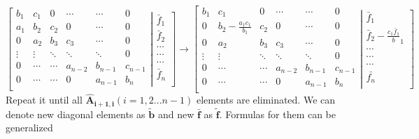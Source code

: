 \documentclass[12pt]{article}
\begin{document}
\[   
\left[\begin{array}{cccccc}   
    b_1 &    c_1    & 0   & \cdots  & \cdots  & 0 \\  
    a_1 &    b_2    & c_2  & 0       & \cdots  & 0\\
    0 &    a_2    & b_3  & c_3       & \cdots  & 0\\ 
    \vdots &    \vdots    & \ddots  & \ddots  & \ddots  & 0\\ 
    0 &    \cdots    & \cdots  & a_{n-2}       & b_{n-1}  & c_{n-1}\\ 
    0 &    \cdots    & \cdots  & 0       & a_{n-1}  & b_{n}\\ 
\end{array}\left|\begin{array}{c}
    \bar{f}_1 \\    \bar{f}_2   \\ \cdots\\ \cdots \\ \cdots \\ \bar{f}_n\\
 \end{array}\right]\right. \rightarrow \left[\begin{array}{cccccc}   
    b_1 &    c_1    & 0   & \cdots  & \cdots  & 0 \\  
    0 &    b_2 - \frac{a_1c_1}{b_1}    & c_2  & 0       & \cdots  & 0\\
    0 &    a_2    & b_3  & c_3       & \cdots  & 0\\ 
    \vdots &    \vdots    & \ddots  & \ddots  & \ddots  & 0\\ 
    0 &    \cdots    & \cdots  & a_{n-2}       & b_{n-1}  & c_{n-1}\\ 
    0 &    \cdots    & \cdots  & 0       & a_{n-1}  & b_{n}\\ 
\end{array}\left|\begin{array}{c}
    \bar{f}_1 \\  \bar{f}_2-\frac{c_1\bar{f}_1}{b}_1   \\ \cdots\\ \cdots \\ \cdots \\ \bar{f_n}\\
 \end{array}\right]\right.
 \] 
Repeat it until all $\mathbf{\hat{A}_{i+1,i}} (i = 1, 2 ... n-1)$ elements are eliminated. We can denote new diagonal elements as $\mathbf{\tilde{b}}$ and new $\mathbf{\bar{f}}$ as  $\mathbf{\tilde{f}}$. Formulas for them can be generalized
\end{document}
